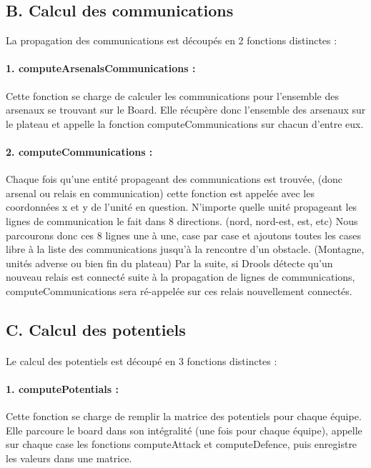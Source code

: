 		\subsection{B. Calcul des communications}
		
			La propagation des communications est découpés en 2 fonctions distinctes :
			
			\paragraph{1. computeArsenalsCommunications : }
			Cette fonction se charge de calculer les communications pour l'ensemble des arsenaux se trouvant sur le Board.
			Elle récupère donc l'ensemble des arsenaux sur le plateau et appelle la fonction computeCommunications sur chacun d'entre eux.
			
			\paragraph{2. computeCommunications : }
			Chaque fois qu'une entité propageant des communications est trouvée, (donc arsenal ou relais en communication) cette fonction est appelée
			avec les coordonnées x et y de l'unité en question.
			N'importe quelle unité propageant les lignes de communication le fait dans 8 directions. (nord, nord-est, est, etc)
			Nous parcourons donc ces 8 lignes une à une, case par case et ajoutons toutes les cases libre à la liste des communications jusqu'à
			la rencontre d'un obstacle. (Montagne, unités adverse ou bien fin du plateau)
			Par la suite, si Drools détecte qu'un nouveau relais est connecté suite à la propagation de lignes de communications, computeCommunications
			sera ré-appelée sur ces relais nouvellement connectés.
		
		\subsection{C. Calcul des potentiels}
		
			\paragraph{}
			Le calcul des potentiels est découpé en 3 fonctions distinctes :
			
			\paragraph{1. computePotentials : }
			Cette fonction se charge de remplir la matrice des potentiels pour chaque équipe.
			Elle parcoure le board dans son intégralité (une fois pour chaque équipe), appelle sur chaque case les fonctions computeAttack et 
			computeDefence, puis enregistre les valeurs dans une matrice.
			
